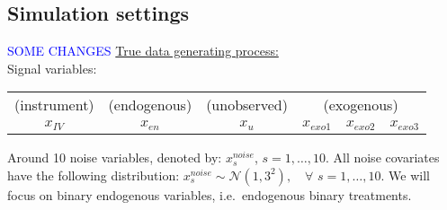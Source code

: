 \documentclass[12pt]{article}
\newcommand{\blue}[1]{\textcolor{blue}{#1}}
\begin{document}
\subsection*{Simulation settings}
\blue{SOME CHANGES}
\underline{True data generating process:}\\
Signal variables:
\begin{center}
\begin{tabular}{cccc}
(instrument) & (endogenous) & (unobserved) & \quad (exogenous) \\
$x_{IV}$ &  $x_{en}$ & $x_{u}$ & $x_{exo1} \quad x_{exo2} \quad x_{exo3}$ 
\end{tabular}
\end{center}

Around 10 noise variables, denoted by: $x^{noise}_s$, $s = 1, \dots, 10$. All noise covariates have the following distribution: $x^{noise}_s \sim \mathcal{N}(1,3^2), \quad \forall$ $s = 1,\dots, 10.$
We will focus on binary endogenous variables, i.e.\ endogenous binary treatments.
\end{document}
